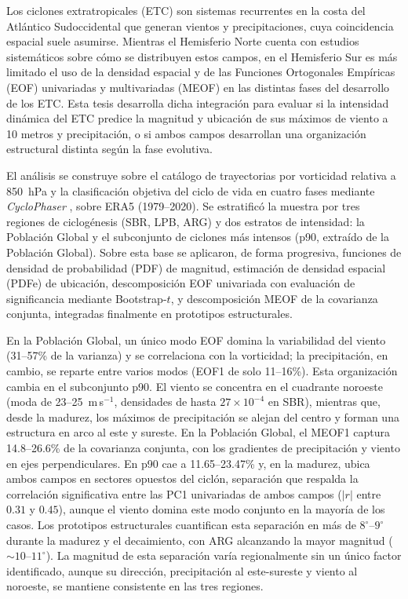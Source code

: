 Los ciclones extratropicales (ETC) son sistemas recurrentes en la costa del Atlántico Sudoccidental que generan vientos y precipitaciones, cuya coincidencia espacial suele asumirse. 
Mientras el Hemisferio Norte cuenta con estudios sistemáticos sobre cómo se distribuyen estos campos, en el Hemisferio Sur es más limitado el uso de la densidad espacial y de las Funciones Ortogonales Empíricas (EOF) univariadas y multivariadas (MEOF) en las distintas fases del desarrollo de los ETC.
Esta tesis desarrolla dicha integración para evaluar si la intensidad dinámica del ETC predice la magnitud y ubicación de sus máximos de viento a 10 metros y precipitación, o si ambos campos desarrollan una organización estructural distinta según la fase evolutiva.

El análisis se construye sobre el catálogo de trayectorias por vorticidad relativa a 850~hPa \citep{gramcianinov2020analysis} y la clasificación objetiva del ciclo de vida en cuatro fases mediante \textit{CycloPhaser} \citep{coutodesouza2024new, deSouza2025CycloPhaser}, sobre ERA5 (1979--2020). 
Se estratificó la muestra por tres regiones de ciclogénesis (SBR, LPB, ARG) y dos estratos de intensidad: la Población Global y el subconjunto de ciclones más intensos (p90, extraído de la Población Global). 
Sobre esta base se aplicaron, de forma progresiva, funciones de densidad de probabilidad (PDF) de magnitud, estimación de densidad espacial (PDFe) de ubicación, descomposición EOF univariada con evaluación de significancia mediante Bootstrap-$t$, y descomposición MEOF de la covarianza conjunta, integradas finalmente en prototipos estructurales.

En la Población Global, un único modo EOF domina la variabilidad del viento (31--57\% de la varianza) y se correlaciona con la vorticidad; la precipitación, en cambio, se reparte entre varios modos (EOF1 de solo 11--16\%).
Esta organización cambia en el subconjunto p90. El viento se concentra en el cuadrante noroeste (moda de 23--25~m\,s$^{-1}$, densidades de hasta $27\times10^{-4}$ en SBR), mientras que, desde la madurez, los máximos de precipitación se alejan del centro y forman una estructura en arco al este y sureste.
En la Población Global, el MEOF1 captura 14.8--26.6\% de la covarianza conjunta, con los gradientes de precipitación y viento en ejes perpendiculares. En p90 cae a 11.65--23.47\% y, en la madurez, ubica ambos campos en sectores opuestos del ciclón, separación que respalda la correlación significativa entre las PC1 univariadas de ambos campos ($|r|$ entre $0.31$ y $0.45$), aunque el viento domina este modo conjunto en la mayoría de los casos.
Los prototipos estructurales cuantifican esta separación en más de $8^{\circ}$--$9^{\circ}$ durante la madurez y el decaimiento, con ARG alcanzando la mayor magnitud (${\sim}10$--$11^{\circ}$). 
La magnitud de esta separación varía regionalmente sin un único factor identificado, aunque su dirección, precipitación al este-sureste y viento al noroeste, se mantiene consistente en las tres regiones.


